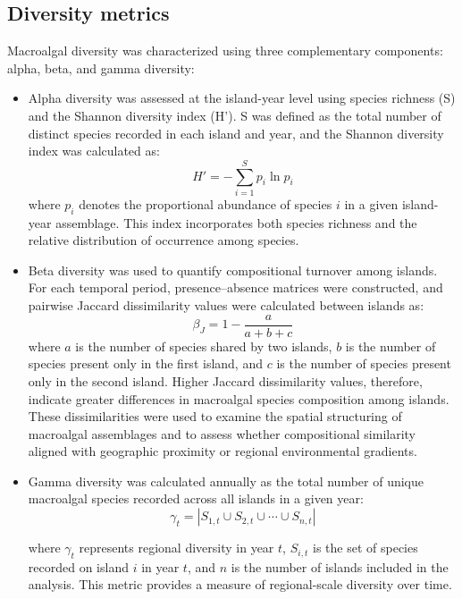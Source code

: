 \documentclass[a4paper,fleqn]{cas-sc}
\begin{document}
\subsection{Diversity metrics}
Macroalgal diversity was characterized using three complementary components: alpha, beta, and gamma diversity: 

\begin{itemize}
    \item Alpha diversity was assessed at the island-year level using species richness (S) and the Shannon diversity index (H'). S was defined as the total number of distinct species recorded in each island and year, and the Shannon diversity index was calculated as:
    \begin{equation}
        H' = - \sum_{i=1}^{S} p_{i} \ln{p_i}
    \end{equation}
    where $p_i$ denotes the proportional abundance of species $i$ in a given island-year assemblage. This index incorporates both species richness and the relative distribution of occurrence among species.

    \item Beta diversity was used to quantify compositional turnover among islands. For each temporal period, presence--absence matrices were constructed, and pairwise Jaccard dissimilarity values were calculated between islands as:
    \begin{equation}
    \beta_J = 1 - \frac{a}{a + b + c}
    \end{equation}
    where $a$ is the number of species shared by two islands, $b$ is the number of species present only in the first island, and $c$ is the number of species present only in the second island. Higher Jaccard dissimilarity values, therefore, indicate greater differences in macroalgal species composition among islands. These dissimilarities were used to examine the spatial structuring of macroalgal assemblages and to assess whether compositional similarity aligned with geographic proximity or regional environmental gradients.

    \item Gamma diversity was calculated annually as the total number of unique macroalgal species recorded across all islands in a given year:
    \begin{equation}
    \gamma_t = \left| S_{1,t} \cup S_{2,t} \cup \cdots \cup S_{n,t} \right|
    \end{equation}
    
    where $\gamma_t$ represents regional diversity in year $t$, $S_{i,t}$ is the set of species recorded on island $i$ in year $t$, and $n$ is the number of islands included in the analysis. This metric provides a measure of regional-scale diversity over time.
\end{itemize} 
\end{document}
